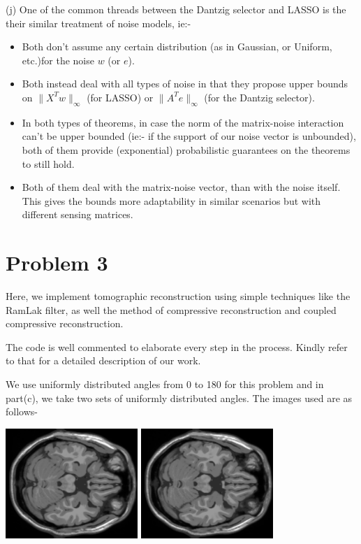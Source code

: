 \documentclass[a4paper,11pt]{article}
\numberwithin{definition}{section}
\numberwithin{mytheorem}{subsection}
\begin{document}
(j) One of the common threads between the Dantzig selector and LASSO is the their similar treatment of noise models, ie:-
\begin{itemize}
    \item Both don't assume any certain distribution (as in Gaussian, or Uniform, etc.)for the noise $w$ (or $e$).
    \item Both instead deal with all types of noise in that they propose upper bounds on $\lVert X^Tw\rVert_{\infty}$ (for LASSO) or $\lVert A^Te\rVert_{\infty}$ (for the Dantzig selector).
    \item In both types of theorems, in case the norm of the matrix-noise interaction can't be upper bounded (ie:- if the support of our noise vector is unbounded), both of them provide (exponential) probabilistic guarantees on the theorems to still hold.
    \item Both of them deal with the matrix-noise vector, than with the noise itself. This gives the bounds more adaptability in similar scenarios but with different sensing matrices.
\end{itemize}
\section{Problem 3}

Here, we implement tomographic reconstruction using simple techniques like the RamLak filter, as well the method of compressive reconstruction and coupled compressive reconstruction. 

The code is well commented to elaborate every step in the process. Kindly refer to that for a detailed description of our work.

We use uniformly distributed angles from 0 to 180 for this problem and in part(c), we take two sets of uniformly distributed angles. The images used are as follows-

\begin{center}
    \includegraphics[width=5cm]{slice_50.png}
    \includegraphics[width=5cm]{slice_51.png}
\end{center}
\end{document}

